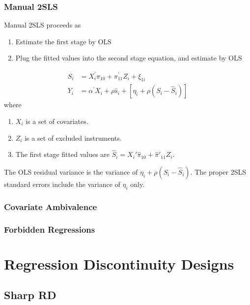 \documentclass[11pt]{article}
\begin{document}
\subsubsection{Manual 2SLS}

Manual 2SLS proceeds as
\begin{enumerate}
	\item Estimate the first stage by OLS
	\item Plug the fitted values into the second stage equation, and estimate by OLS
\end{enumerate}
\begin{equation}
	\begin{aligned} S_{i} &=X_{i}^{\prime} \pi_{10}+\pi_{11}^{\prime} Z_{i}+\xi_{1 i} \\ 
	Y_{i} &=\alpha^{\prime} X_{i}+\rho \hat{s}_{i}+\left[\eta_{i}+\rho\left(S_{i}-\hat{S}_{i}\right)\right] 
	\end{aligned}
\end{equation}
where
\begin{enumerate}
	\item $X_i$ is a set of covariates.
	\item $Z_i$ is a set of excluded instruments.
	\item The first stage fitted values are $\hat{S}_i = X_i' \hat{\pi}_{10} + \hat{\pi}'_{11} Z_i$.  
\end{enumerate}

The OLS residual variance is the variance of $\eta_i + \rho(S_i - \hat{S}_i)$. The proper 2SLS standard errors include the variance of $\eta_i$ only. 

\subsubsection{Covariate Ambivalence}

\subsubsection{Forbidden Regressions}


\section{Regression Discontinuity Designs}

\subsection{Sharp RD}
\end{document}
